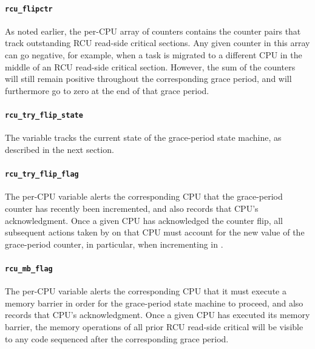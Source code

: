 \paragraph{{\tt rcu\_flipctr}}
\label{app:rcuimpl:rcu_flipctr}

As noted earlier, the 
per-CPU array of counters contains the
counter pairs that track outstanding RCU read-side critical sections.
Any given counter in this array can go negative, for example, when
a task is migrated to a different CPU in the middle of an RCU
read-side critical section.
However, the sum of the counters will
still remain positive throughout the corresponding grace period, and will
furthermore go to zero at the end of that grace period.

\paragraph{{\tt rcu\_try\_flip\_state}}
\label{app:rcuimpl:rcu_try_flip_state}

The  variable tracks the current state of
the grace-period state machine, as described in the next section.

\paragraph{{\tt rcu\_try\_flip\_flag}}
\label{app:rcuimpl:rcu_try_flip_flag}

The  per-CPU variable alerts the corresponding
CPU that the grace-period counter has recently been incremented, and
also records that CPU's acknowledgment.
Once a given CPU has acknowledged the counter flip, all subsequent actions
taken by  on that CPU must account for the
new value of the grace-period counter, in particular, when incrementing
 in .

\paragraph{{\tt rcu\_mb\_flag}}
\label{app:rcuimpl:rcu_mb_flag}

The  per-CPU variable alerts the corresponding
CPU that it must execute a memory barrier in order for the grace-period
state machine to proceed, and also records that CPU's acknowledgment.
Once a given CPU has executed its memory barrier, the memory operations
of all prior RCU read-side critical will be visible to any code sequenced
after the corresponding grace period.


